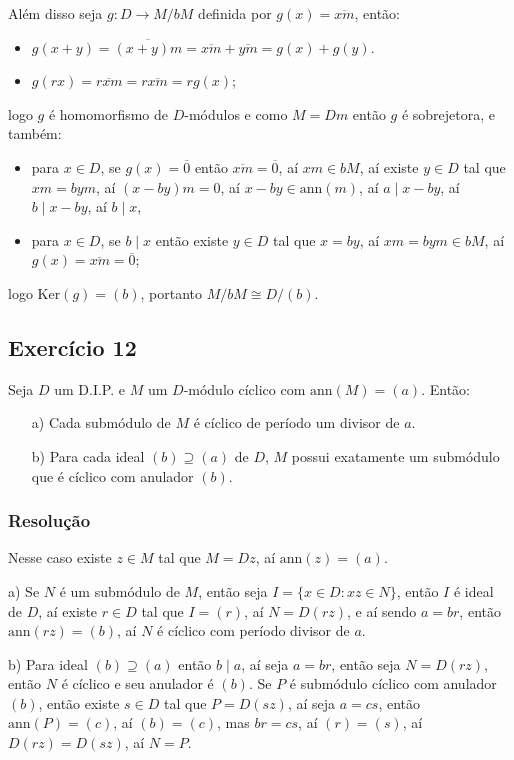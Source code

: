 \documentclass[10pt,a4paper]{article}
\begin{document}
\medskip
\noindent
Além disso seja $g:D\rightarrow M/bM$ definida por $g(x)=\overline{xm}$, então:
\begin{itemize}
\item $g(x+y)=\overline{(x+y)m}=\overline{xm}+\overline{ym}=g(x)+g(y)$.
\item $g(rx)=\overline{rxm}=r\overline{xm}=rg(x)$;
\end{itemize}
logo $g$ é homomorfismo de $D$-módulos e como $M=Dm$ então $g$ é sobrejetora, e também:
\begin{itemize}
\item para $x\in D$, se $g(x)=\overline{0}$ então $\overline{xm}=\overline{0}$, aí $xm\in bM$, aí existe $y\in D$ tal que $xm=bym$, aí $(x-by)m=0$, aí $x-by\in\mathrm{ann}(m)$, aí $a\mid x-by$, aí $b\mid x-by$, aí $b\mid x$,
\item para $x\in D$, se $b\mid x$ então existe $y\in D$ tal que $x=by$, aí $xm=bym\in bM$, aí $g(x)=\overline{xm}=\overline{0}$;
\end{itemize}
logo $\mathrm{Ker}(g)=(b)$, portanto $M/bM\cong D/(b)$.

\subsection*{Exercício 12}

Seja $D$ um D.I.P. e $M$ um $D$-módulo cíclico com $\mathrm{ann}(M)=(a)$. Então:
\begin{itemize}
\item[a)] Cada submódulo de $M$ é cíclico de período um divisor de $a$.
\item[b)] Para cada ideal $(b)\supseteq(a)$ de $D$, $M$ possui exatamente um submódulo que é cíclico com anulador $(b)$.
\end{itemize}

\subsubsection*{Resolução}

Nesse caso existe $z\in M$ tal que $M=Dz$, aí $\mathrm{ann}(z)=(a)$.

\medskip
\noindent
a) Se $N$ é um submódulo de $M$, então seja $I=\{x\in D:xz\in N\}$, então $I$ é ideal de $D$, aí existe $r\in D$ tal que $I=(r)$, aí $N=D(rz)$, e aí sendo $a=br$, então $\mathrm{ann}(rz)=(b)$, aí $N$ é cíclico com período divisor de $a$.

\medskip
\noindent
b) Para ideal $(b)\supseteq(a)$ então $b\mid a$, aí seja $a=br$, então seja $N=D(rz)$, então $N$ é cíclico e seu anulador é $(b)$. Se $P$ é submódulo cíclico com anulador $(b)$, então existe $s\in D$ tal que $P=D(sz)$, aí seja $a=cs$, então $\mathrm{ann}(P)=(c)$, aí $(b)=(c)$, mas $br=cs$, aí $(r)=(s)$, aí $D(rz)=D(sz)$, aí $N=P$.
\end{document}
